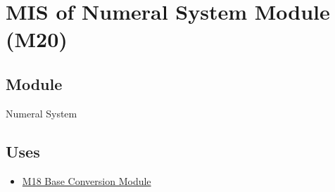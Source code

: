 \documentclass[12pt, titlepage]{article}
\begin{document}
%
%
%
%
%
%
%
%

\newpage
\section{MIS of Numeral System Module (M20)}\label{sec:numeral-system-module}

\subsection{Module}
Numeral System

\subsection{Uses}
\begin{itemize}
    \item \hyperref[sec:base-conversion-module]{M18 Base Conversion Module}
\end{itemize}
\end{document}
